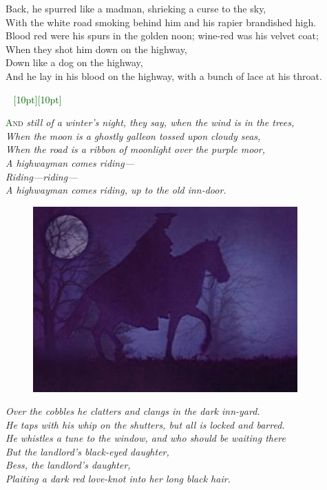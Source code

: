 \documentclass[oneside,12pt,english]{book}
\newcommand*\initfamily{\usefont{U}{Acorn}{xl}{n}}
\newcommand{\ornamento}{\vspace{2em}\noindent \textcolor{darkgreen}{\hrulefill~ \raisebox{-2.5pt}[10pt][10pt]{\leafright \decofourleft \decothreeleft  \aldineright \decotwo \floweroneleft \decoone   \floweroneright \decotwo \aldineleft\decothreeright \decofourright \leafleft} ~  \hrulefill \\ \vspace{2em}}}
\begin{document}
Back, he spurred like a madman, shrieking a curse to the sky,\\
With the white road smoking behind him and his rapier brandished high.\\
Blood red were his spurs in the golden noon; wine-red was his velvet coat;\\
When they shot him down on the highway,\\
Down like a dog on the highway,\\
And he lay in his blood on the highway, with a bunch of lace at his throat.


\ornamento
\pagebreak

{\lettrine[lines=3]{\initfamily\textcolor{darkgreen}{A}}{nd} \textit{still of a 
winter's night, they say, when the wind is in the trees,\\
When the moon is a ghostly galleon tossed upon cloudy seas,\\
When the road is a ribbon of moonlight over the purple moor,\\
A highwayman comes riding---\\
Riding---riding---\\
A highwayman comes riding, up to the old inn-door.}

\begin{figure}[H]
\centering
\includegraphics[height=2.8in]{fig-06.jpg}
\end{figure}

\textit{Over the cobbles he clatters and clangs in the dark inn-yard.\\
He taps with his whip on the shutters, but all is locked and barred.\\
He whistles a tune to the window, and who should be waiting there\\
But the landlord’s black-eyed daughter,\\
Bess, the landlord’s daughter,\\
Plaiting a dark red love-knot into her long black hair.}


}
\end{document}
